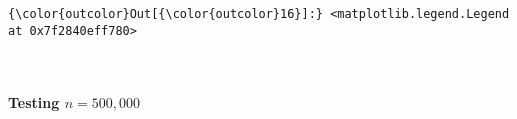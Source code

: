 \documentclass[11pt]{article}
\begin{document}
\begin{Verbatim}[commandchars=\\\{\}]
{\color{outcolor}Out[{\color{outcolor}16}]:} <matplotlib.legend.Legend at 0x7f2840eff780>
\end{Verbatim}
            
    \begin{center}
    \end{center}
    { \hspace*{\fill} \\}
    
    \paragraph{\texorpdfstring{Testing
\(n=500,000\)}{Testing n=500,000}}\label{testing-n500000}
\end{document}

